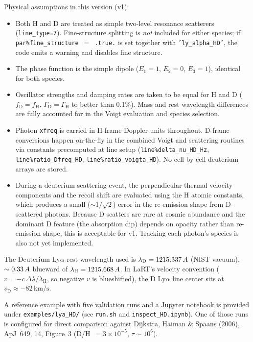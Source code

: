\documentclass[english,a4paper]{my_memo}
\newcommand{\parm}[1]{\texttt{par\%#1}}
\begin{document}
Physical assumptions in this version (v1):

\begin{itemize}
  \item Both H and D are treated as simple two-level resonance scatterers
        (\texttt{line\_type=7}). Fine-structure splitting is \emph{not}
        included for either species; if \parm{fine\_structure}~$=$~\texttt{.true.}
        is set together with \texttt{'ly\_alpha\_HD'}, the code emits a warning
        and disables fine structure.
  \item The phase function is the simple dipole ($E_1=1$, $E_2=0$, $E_3=1$),
        identical for both species.
  \item Oscillator strengths and damping rates are taken to be equal for H and
        D ($f_\mathrm{D}=f_\mathrm{H}$, $\Gamma_\mathrm{D}=\Gamma_\mathrm{H}$ to
        better than 0.1\%).  Mass and rest wavelength differences are fully
        accounted for in the Voigt evaluation and species selection.
  \item Photon \texttt{xfreq} is carried in H-frame Doppler units throughout.
        D-frame conversions happen on-the-fly in the combined Voigt and
        scattering routines via constants precomputed at line setup
        (\texttt{line\%delta\_nu\_HD\_Hz}, \texttt{line\%ratio\_Dfreq\_HD},
        \texttt{line\%ratio\_voigta\_HD}).  No cell-by-cell deuterium arrays are
        stored.
  \item During a deuterium scattering event, the perpendicular thermal velocity
        components and the recoil shift are evaluated using the H atomic
        constants, which produces a small ($\sim 1/\sqrt{2}$) error in the
        re-emission shape from D-scattered photons.  Because D scatters are
        rare at cosmic abundance and the dominant D feature (the absorption
        dip) depends on opacity rather than re-emission shape, this is
        acceptable for v1.  Tracking each photon's species is also not yet
        implemented.
\end{itemize}

The Deuterium Ly$\alpha$ rest wavelength used is $\lambda_\mathrm{D}=1215.337\,\AA$
(NIST vacuum), $\sim 0.33\,\AA$ blueward of $\lambda_\mathrm{H}=1215.668\,\AA$.
In LaRT's velocity convention ($v=-c\,\Delta\lambda/\lambda_\mathrm{H}$, so
negative $v$ is blueshifted), the D Ly$\alpha$ line center sits at
$v_\mathrm{D}\approx -82\,\mathrm{km/s}$.

A reference example with five validation runs and a Jupyter notebook is provided
under \texttt{examples/lya\_HD/} (see \texttt{run.sh} and
\texttt{inspect\_HD.ipynb}). One of those runs is configured for direct
comparison against Dijkstra, Haiman \& Spaans (2006), ApJ~649, 14, Figure~3
(D/H~$=3\times 10^{-5}$, $\tau\sim 10^6$).
\end{document}
